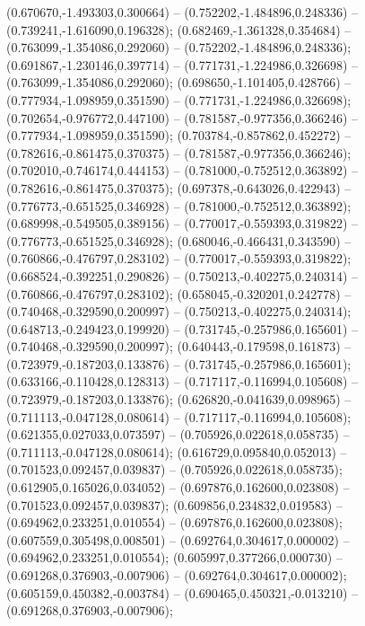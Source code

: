  (0.670670,-1.493303,0.300664) -- (0.752202,-1.484896,0.248336) -- (0.739241,-1.616090,0.196328);
 (0.682469,-1.361328,0.354684) -- (0.763099,-1.354086,0.292060) -- (0.752202,-1.484896,0.248336);
 (0.691867,-1.230146,0.397714) -- (0.771731,-1.224986,0.326698) -- (0.763099,-1.354086,0.292060);
 (0.698650,-1.101405,0.428766) -- (0.777934,-1.098959,0.351590) -- (0.771731,-1.224986,0.326698);
 (0.702654,-0.976772,0.447100) -- (0.781587,-0.977356,0.366246) -- (0.777934,-1.098959,0.351590);
 (0.703784,-0.857862,0.452272) -- (0.782616,-0.861475,0.370375) -- (0.781587,-0.977356,0.366246);
 (0.702010,-0.746174,0.444153) -- (0.781000,-0.752512,0.363892) -- (0.782616,-0.861475,0.370375);
 (0.697378,-0.643026,0.422943) -- (0.776773,-0.651525,0.346928) -- (0.781000,-0.752512,0.363892);
 (0.689998,-0.549505,0.389156) -- (0.770017,-0.559393,0.319822) -- (0.776773,-0.651525,0.346928);
 (0.680046,-0.466431,0.343590) -- (0.760866,-0.476797,0.283102) -- (0.770017,-0.559393,0.319822);
 (0.668524,-0.392251,0.290826) -- (0.750213,-0.402275,0.240314) -- (0.760866,-0.476797,0.283102);
 (0.658045,-0.320201,0.242778) -- (0.740468,-0.329590,0.200997) -- (0.750213,-0.402275,0.240314);
 (0.648713,-0.249423,0.199920) -- (0.731745,-0.257986,0.165601) -- (0.740468,-0.329590,0.200997);
 (0.640443,-0.179598,0.161873) -- (0.723979,-0.187203,0.133876) -- (0.731745,-0.257986,0.165601);
 (0.633166,-0.110428,0.128313) -- (0.717117,-0.116994,0.105608) -- (0.723979,-0.187203,0.133876);
 (0.626820,-0.041639,0.098965) -- (0.711113,-0.047128,0.080614) -- (0.717117,-0.116994,0.105608);
 (0.621355,0.027033,0.073597) -- (0.705926,0.022618,0.058735) -- (0.711113,-0.047128,0.080614);
 (0.616729,0.095840,0.052013) -- (0.701523,0.092457,0.039837) -- (0.705926,0.022618,0.058735);
 (0.612905,0.165026,0.034052) -- (0.697876,0.162600,0.023808) -- (0.701523,0.092457,0.039837);
 (0.609856,0.234832,0.019583) -- (0.694962,0.233251,0.010554) -- (0.697876,0.162600,0.023808);
 (0.607559,0.305498,0.008501) -- (0.692764,0.304617,0.000002) -- (0.694962,0.233251,0.010554);
 (0.605997,0.377266,0.000730) -- (0.691268,0.376903,-0.007906) -- (0.692764,0.304617,0.000002);
 (0.605159,0.450382,-0.003784) -- (0.690465,0.450321,-0.013210) -- (0.691268,0.376903,-0.007906);
